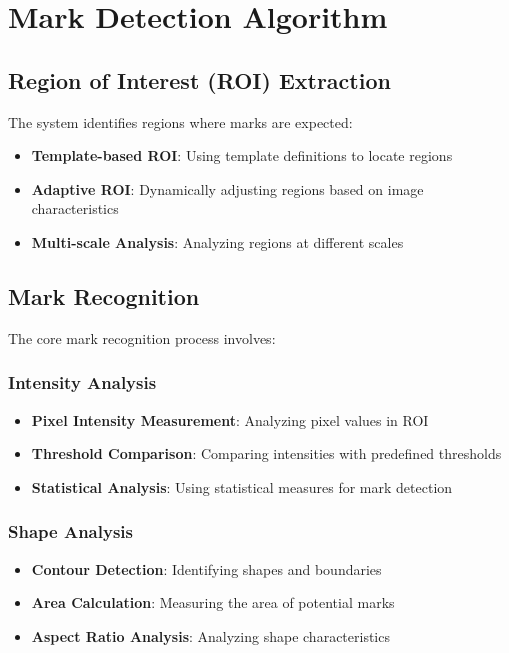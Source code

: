 \section{Mark Detection Algorithm}

\subsection{Region of Interest (ROI) Extraction}

The system identifies regions where marks are expected:

\begin{itemize}
\item \textbf{Template-based ROI}: Using template definitions to locate regions
\item \textbf{Adaptive ROI}: Dynamically adjusting regions based on image characteristics
\item \textbf{Multi-scale Analysis}: Analyzing regions at different scales
\end{itemize}

\subsection{Mark Recognition}

The core mark recognition process involves:

\subsubsection{Intensity Analysis}
\begin{itemize}
\item \textbf{Pixel Intensity Measurement}: Analyzing pixel values in ROI
\item \textbf{Threshold Comparison}: Comparing intensities with predefined thresholds
\item \textbf{Statistical Analysis}: Using statistical measures for mark detection
\end{itemize}

\subsubsection{Shape Analysis}
\begin{itemize}
\item \textbf{Contour Detection}: Identifying shapes and boundaries
\item \textbf{Area Calculation}: Measuring the area of potential marks
\item \textbf{Aspect Ratio Analysis}: Analyzing shape characteristics
\end{itemize}

